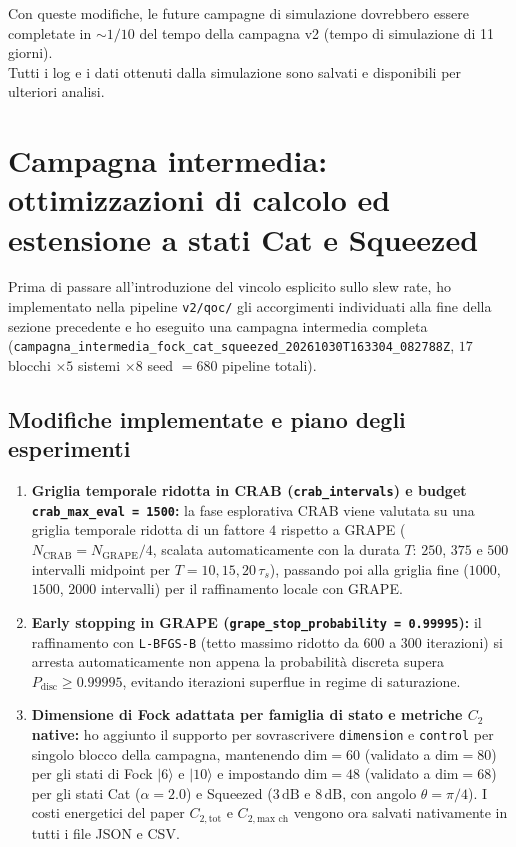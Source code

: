 \documentclass[11pt,a4paper]{article}
\begin{document}
\noindent
Con queste modifiche, le future campagne di simulazione dovrebbero essere completate in $\sim 1/10$ del tempo della campagna v2 (tempo di simulazione di 11 giorni).\\

\noindent
Tutti i log e i dati ottenuti dalla simulazione sono salvati e disponibili per ulteriori analisi.

\newpage
\section{Campagna intermedia: ottimizzazioni di calcolo ed estensione a stati Cat e Squeezed}

Prima di passare all'introduzione del vincolo esplicito sullo slew rate, ho implementato nella pipeline \texttt{v2/qoc/} gli accorgimenti individuati alla fine della sezione precedente e ho eseguito una campagna intermedia completa (\texttt{campagna\_intermedia\_fock\_cat\_squeezed\_20261030T163304\_082788Z}, $17$ blocchi $\times 5$ sistemi $\times 8$ seed $= 680$ pipeline totali).

\subsection{Modifiche implementate e piano degli esperimenti}
\begin{enumerate}
    \item \textbf{Griglia temporale ridotta in CRAB (\texttt{crab\_intervals}) e budget \texttt{crab\_max\_eval = 1500}:} la fase esplorativa CRAB viene valutata su una griglia temporale ridotta di un fattore $4$ rispetto a GRAPE ($N_{\text{CRAB}} = N_{\text{GRAPE}}/4$, scalata automaticamente con la durata $T$: $250$, $375$ e $500$ intervalli midpoint per $T = 10, 15, 20\,\tau_s$), passando poi alla griglia fine ($1000$, $1500$, $2000$ intervalli) per il raffinamento locale con GRAPE.
    \item \textbf{Early stopping in GRAPE (\texttt{grape\_stop\_probability = 0.99995}):} il raffinamento con \texttt{L-BFGS-B} (tetto massimo ridotto da $600$ a $300$ iterazioni) si arresta automaticamente non appena la probabilità discreta supera $P_{\text{disc}} \ge 0.99995$, evitando iterazioni superflue in regime di saturazione.
    \item \textbf{Dimensione di Fock adattata per famiglia di stato e metriche $C_2$ native:} ho aggiunto il supporto per sovrascrivere \texttt{dimension} e \texttt{control} per singolo blocco della campagna, mantenendo $\text{dim}=60$ (validato a $\text{dim}=80$) per gli stati di Fock $|6\rangle$ e $|10\rangle$ e impostando $\text{dim}=48$ (validato a $\text{dim}=68$) per gli stati Cat ($\alpha=2.0$) e Squeezed ($3\,\text{dB}$ e $8\,\text{dB}$, con angolo $\theta = \pi/4$). I costi energetici del paper $C_{2,\text{tot}}$ e $C_{2,\text{max ch}}$ vengono ora salvati nativamente in tutti i file JSON e CSV.
\end{enumerate}
\end{document}
